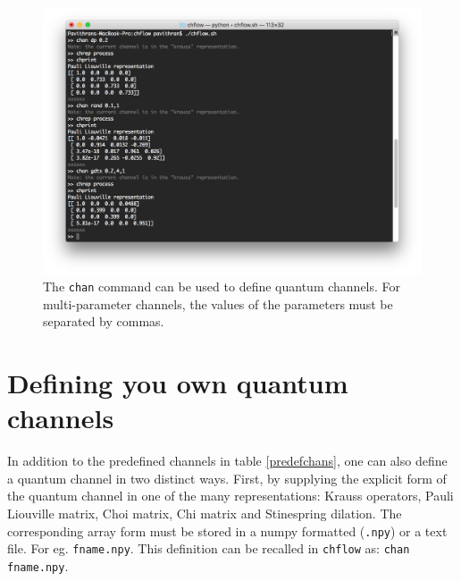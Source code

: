 \documentclass[11pt]{article}
\begin{document}
\begin{figure}[H]
\begin{center}
\includegraphics[scale=0.27]{chandefs.jpg}
\caption{The \texttt{chan} command can be used to define quantum channels. For multi-parameter channels, the values of the parameters must be separated by commas.}
\label{fig:predefchans}
\end{center}
\end{figure}

\section{Defining you own quantum channels}
In addition to the predefined channels in table \ref{predefchans}, one can also define a quantum channel in two distinct ways. First, by supplying the explicit form of the quantum channel in one of the many representations: Krauss operators, Pauli Liouville matrix, Choi matrix, Chi matrix and Stinespring dilation. The corresponding array form must be stored in a numpy formatted (\texttt{.npy}) or a text file. For eg. \texttt{fname.npy}. This definition can be recalled in \texttt{chflow} as: \texttt{chan fname.npy}.
\end{document}

